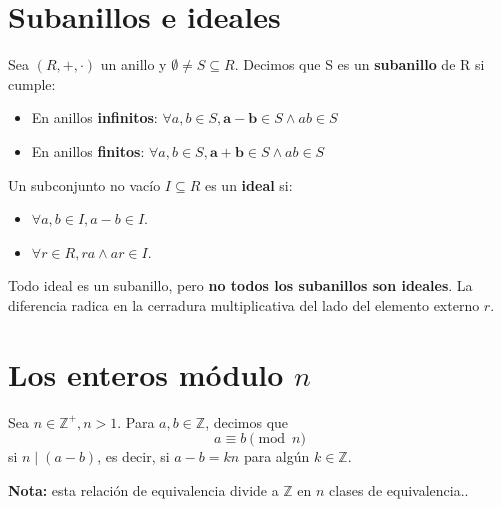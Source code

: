 \documentclass[12pt]{article}
\begin{document}
\newpage

\section*{Subanillos e ideales}

\begin{tcolorbox}[title=Subanillo]
Sea \( (R, +, \cdot) \) un anillo y \( \emptyset \neq S \subseteq R \). Decimos que S es un \textbf{subanillo} de R si cumple:
\begin{itemize}
    \item En anillos \textbf{infinitos}: \( \forall a,b \in S, \boldsymbol{a - b} \in S \land ab \in S \)
    \item En anillos \textbf{finitos}: \( \forall a,b \in S, \boldsymbol{a + b} \in S \land ab \in S \)
\end{itemize}
\end{tcolorbox}

\begin{tcolorbox}[title=Ideales]
Un subconjunto no vacío \( I \subseteq R \) es un \textbf{ideal} si:
\begin{itemize}
    \item \( \forall a, b \in I, a - b \in I \).
    \item \( \forall r \in R, ra \land ar \in I \).
\end{itemize}
\end{tcolorbox}

\begin{tcolorbox}[colback=yellow!15, title=Importante]
Todo ideal es un subanillo, pero \textbf{no todos los subanillos son ideales}. La diferencia radica en la cerradura multiplicativa del lado del elemento externo \( r \).
\end{tcolorbox}

\newpage

\section*{Los enteros módulo \( n \)}

\begin{tcolorbox}[title=Congruencia modular]
Sea \( n \in \mathbb{Z}^+, n > 1 \). Para \( a, b \in \mathbb{Z} \), decimos que
\[
a \equiv b \pmod{n}
\]
si \( n \mid (a - b) \), es decir, si \( a - b = kn \) para algún \( k \in \mathbb{Z} \).

\bigskip

\textbf{Nota:} esta relación de equivalencia divide a \( \mathbb{Z} \) en \( n \) clases de equivalencia..
\end{tcolorbox}
\end{document}

